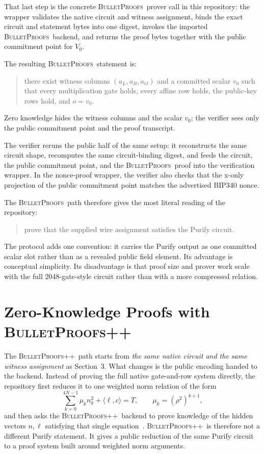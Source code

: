 \documentclass[11pt]{article}
\DeclareRobustCommand{\bp}{{\normalfont\scshape BulletProofs}}
\DeclareRobustCommand{\bppp}{{\normalfont\scshape BulletProofs++}}
\begin{document}
That last step is the concrete \bp\ prover call in this repository: the wrapper validates
the native circuit and witness assignment, binds the exact circuit and statement bytes into one
digest, invokes the imported \bp\ backend, and returns the proof bytes together with the
public commitment point for $V_0$.

The resulting \bp\ statement is:
\begin{quote}
there exist witness columns $(a_L,a_R,a_O)$ and a committed scalar $v_0$ such that every
multiplication gate holds, every affine row holds, the public-key rows hold, and $o=v_0$.
\end{quote}
Zero knowledge hides the witness columns and the scalar $v_0$; the verifier sees only the public
commitment point and the proof transcript.

The verifier reruns the public half of the same setup: it reconstructs the same circuit shape,
recomputes the same circuit-binding digest, and feeds the circuit, the public commitment point, and
the \bp\ proof into the verification wrapper. In the nonce-proof wrapper, the verifier also
checks that the x-only projection of the public commitment point matches the advertised BIP340
nonce.

The \bp\ path therefore gives the most literal reading of the repository:
\begin{quote}
prove that the supplied wire assignment satisfies the Purify circuit.
\end{quote}
The protocol adds one convention: it carries the Purify output as one committed scalar slot rather
than as a revealed public field element. Its advantage is conceptual simplicity. Its disadvantage is
that proof size and prover work scale with the full 2048-gate-style circuit rather than with a more
compressed relation.

\section{Zero-Knowledge Proofs with \bppp}

The \bppp\ path starts from \emph{the same native circuit and the same witness assignment} as
Section~3. What changes is the public encoding handed to the backend. Instead of proving the full
native gate-and-row system directly, the repository first reduces it to one weighted norm relation
of the form
\[
\sum_{k=0}^{4N-1} \mu_k n_k^2 + \langle \ell, c \rangle = T,
\qquad
\mu_k = (\rho^2)^{k+1},
\]
and then asks the \bppp\ backend to prove knowledge of the hidden vectors
$n,\ell$ satisfying that single equation~\cite{bulletproofs-plus,bulletproofs-plus-plus,secp-zkp-main,secp-bppp}.
\bppp\ is therefore not a different Purify statement. It gives a public reduction of the same Purify circuit to
a proof system built around weighted norm arguments.
\end{document}

